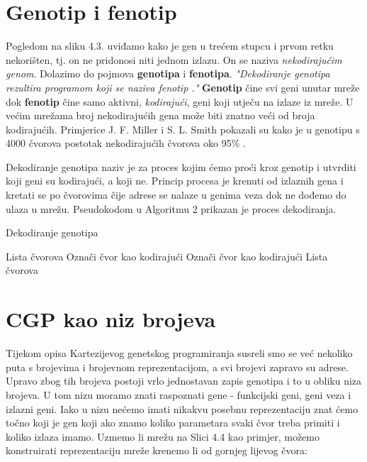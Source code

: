 \section{Genotip i fenotip}
\par 
\quad Pogledom na sliku 4.3. uviđamo kako je gen u trećem stupcu i prvom retku nekorišten, tj. on ne pridonosi niti jednom izlazu. On se naziva \textit{nekodirajućim genom}. Dolazimo do pojmova \textbf{genotipa} i \textbf{fenotipa}. \textit{"Dekodiranje genotipa rezultira programom koji se naziva fenotip \cite{CGPbook}."} \quad \textbf{Genotip} čine svi geni unutar mreže dok \textbf{fenotip} čine samo aktivni,\textit{ kodirajući}, geni koji utječu na izlaze iz mreže. U većim mrežama broj nekodirajućih gena može biti znatno veći od broja kodirajućih. Primjerice J. F. Miller i S. L. Smith pokazali su kako je u genotipu s 4000 čvorova postotak nekodirajućih čvorova oko 95\% \cite{geneticredundancy}. 
\par
Dekodiranje genotipa naziv je za proces kojim ćemo proći kroz genotip i utvrditi koji geni su kodirajući, a koji ne. Princip procesa je krenuti od izlaznih gena i kretati se po čvorovima čije adrese se nalaze u genima veza dok ne dođemo do ulaza u mrežu. Pseudokodom u Algoritmu 2 prikazan je proces dekodiranja.

\begin{algorithm}
	\caption{Dekodiranje genotipa}
	\begin{algorithmic}
		\State Lista čvorova
		\State Označi čvor kao kodirajući
		\EndIf 
		\EndFor
		\State Označi čvor kao kodirajući
		\EndIf 
		\EndFor
		\EndIf
		\EndFor\newline
		\Return Lista čvorova
	\end{algorithmic}
\end{algorithm}
\newpage
\section{CGP kao niz brojeva}
\par 
\quad Tijekom opisa Kartezijevog genetskog programiranja susreli smo se već nekoliko puta s brojevima i brojevnom reprezentacijom, a svi brojevi zapravo su adrese. Upravo zbog tih brojeva postoji vrlo jednostavan zapis genotipa i to u obliku niza brojeva. U tom nizu moramo znati raspoznati gene - funkcijski geni, geni veza i izlazni geni. Iako u nizu nećemo imati nikakvu posebnu reprezentaciju znat ćemo točno koji je gen koji ako znamo koliko parametara svaki čvor treba primiti i koliko izlaza imamo. Uzmemo li mrežu na Slici 4.4 kao primjer, možemo konstruirati reprezentaciju mreže krenemo li od gornjeg lijevog čvora: \newline

